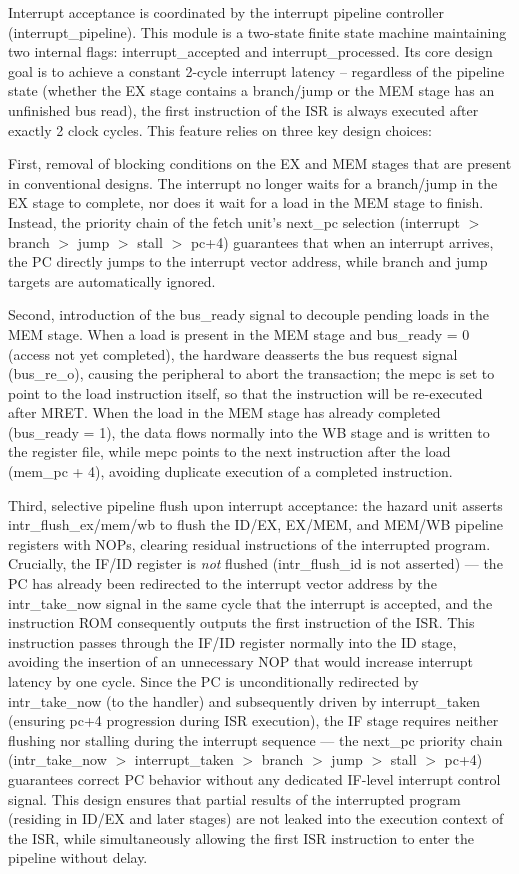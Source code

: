 \documentclass[letterpaper,journal]{IEEEtran}
\begin{document}
Interrupt acceptance is coordinated by the interrupt pipeline controller (interrupt\_pipeline).
This module is a two-state finite state machine maintaining two internal flags: interrupt\_accepted and interrupt\_processed.
Its core design goal is to achieve a constant 2-cycle interrupt latency -- regardless of the pipeline state (whether the EX stage contains a branch/jump or the MEM stage has an unfinished bus read), the first instruction of the ISR is always executed after exactly 2 clock cycles.
This feature relies on three key design choices:

First, removal of blocking conditions on the EX and MEM stages that are present in conventional designs.
The interrupt no longer waits for a branch/jump in the EX stage to complete, nor does it wait for a load in the MEM stage to finish.
Instead, the priority chain of the fetch unit's next\_pc selection (interrupt $>$ branch $>$ jump $>$ stall $>$ pc+4) guarantees that when an interrupt arrives, the PC directly jumps to the interrupt vector address, while branch and jump targets are automatically ignored.

Second, introduction of the bus\_ready signal to decouple pending loads in the MEM stage.
When a load is present in the MEM stage and bus\_ready = 0 (access not yet completed), the hardware deasserts the bus request signal (bus\_re\_o), causing the peripheral to abort the transaction; the mepc is set to point to the load instruction itself, so that the instruction will be re-executed after MRET.
When the load in the MEM stage has already completed (bus\_ready = 1), the data flows normally into the WB stage and is written to the register file, while mepc points to the next instruction after the load (mem\_pc + 4), avoiding duplicate execution of a completed instruction.

Third, selective pipeline flush upon interrupt acceptance: the hazard unit asserts intr\_flush\_ex/mem/wb to flush the ID/EX, EX/MEM, and MEM/WB pipeline registers with NOPs, clearing residual instructions of the interrupted program.
Crucially, the IF/ID register is \emph{not} flushed (intr\_flush\_id is not asserted) --- the PC has already been redirected to the interrupt vector address by the intr\_take\_now signal in the same cycle that the interrupt is accepted, and the instruction ROM consequently outputs the first instruction of the ISR.
This instruction passes through the IF/ID register normally into the ID stage, avoiding the insertion of an unnecessary NOP that would increase interrupt latency by one cycle.
Since the PC is unconditionally redirected by intr\_take\_now (to the handler) and subsequently driven by interrupt\_taken (ensuring pc+4 progression during ISR execution), the IF stage requires neither flushing nor stalling during the interrupt sequence --- the next\_pc priority chain (intr\_take\_now $>$ interrupt\_taken $>$ branch $>$ jump $>$ stall $>$ pc+4) guarantees correct PC behavior without any dedicated IF-level interrupt control signal.
This design ensures that partial results of the interrupted program (residing in ID/EX and later stages) are not leaked into the execution context of the ISR, while simultaneously allowing the first ISR instruction to enter the pipeline without delay.
\end{document}
